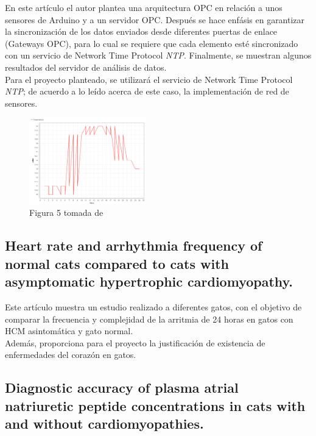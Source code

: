 \documentclass[letterpaper, 10 pt, conference]{ieeeconf}  %
\begin{document}
En este art\'iculo el autor plantea una arquitectura OPC en relaci\'on a unos sensores de Arduino y a un servidor OPC. Despu\'es se hace enf\'asis en garantizar la sincronizaci\'on de los datos enviados desde diferentes puertas de enlace (Gateways OPC), para lo cual se requiere que cada elemento est\'e sincronizado con un servicio de Network Time Protocol \textit{NTP}. Finalmente, se muestran algunos resultados del servidor de an\'alisis de datos.\\

Para el proyecto planteado, se utilizar\'a el servicio de Network Time Protocol \textit{NTP}; de acuerdo a lo le\'ido acerca de este caso, la implementaci\'on de red de sensores.

\begin{figure}
\centering
\label{fig:uno}
\includegraphics[width=0.45\textwidth]{temperatura.png}
\caption{Figura 5 tomada de \cite{c1}}
\end{figure}


\subsection{Heart rate and arrhythmia frequency of normal cats compared to cats with asymptomatic hypertrophic cardiomyopathy. \cite{c2}}

Este art\'iculo muestra un estudio realizado a diferentes gatos, con el objetivo de comparar la frecuencia y complejidad de la arritmia de 24 horas en gatos con HCM asintom\'atica y gato normal.\\

Adem\'as, proporciona para el proyecto la justificaci\'on de existencia de enfermedades del coraz\'on en gatos.

\subsection{Diagnostic accuracy of plasma atrial natriuretic peptide concentrations in cats with and without cardiomyopathies. \cite{c3}}
\end{document}
